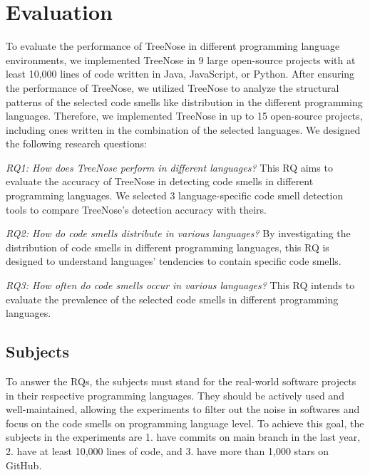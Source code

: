\section{Evaluation}
\label{sec:evaluation}

To evaluate the performance of TreeNose in different programming language environments,
we implemented TreeNose in 9 large open-source projects with at least 10,000 lines of code written in Java, JavaScript, or
Python. After ensuring the performance of TreeNose, we utilized TreeNose to analyze the structural patterns
of the selected code smells like distribution in the different programming languages. Therefore, we implemented TreeNose in up to 15 open-source projects, including
ones written in the combination of the selected languages. We designed the following research questions:

{\it RQ1: How does TreeNose perform in different languages?}
This RQ aims to evaluate the accuracy of TreeNose in detecting code smells in different programming languages. 
We selected 3 language-specific code smell detection tools to compare TreeNose's detection accuracy with theirs.

{\it RQ2: How do code smells distribute in various languages?}
By investigating the distribution of code smells in different programming languages, this RQ is designed to understand 
languages' tendencies to contain specific code smells.

{\it RQ3: How often do code smells occur in various languages?}
This RQ intends to evaluate the prevalence of the selected code smells in different programming languages.

\subsection{Subjects}
\label{sec:subjects}

To answer the RQs, the subjects must stand for the real-world software projects in their respective 
programming languages. They should be actively used and well-maintained, allowing the experiments to filter out 
the noise in softwares and focus on the code smells on programming language level. To achieve this goal, the subjects in the 
experiments are 1. have commits on main branch in the last year, 2. have at least 10,000 lines of code, and 3. have more than 1,000 stars on GitHub.



